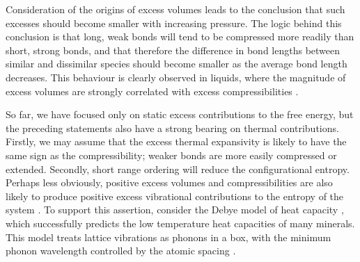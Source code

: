Consideration of the origins of excess volumes leads to the conclusion that such excesses should become smaller with increasing pressure. The logic behind this conclusion is that long, weak bonds will tend to be compressed more readily than short, strong bonds, and that therefore the difference in bond lengths between similar and dissimilar species should become smaller as the average bond length decreases. This behaviour is clearly observed in liquids, where the magnitude of excess volumes are strongly correlated with excess compressibilities \citep{FM1965}.

So far, we have focused only on static excess contributions to the free energy, but the preceding statements also have a strong bearing on thermal contributions. Firstly, we may assume that the excess thermal expansivity is likely to have the same sign as the compressibility; weaker bonds are more easily compressed or extended. Secondly, short range ordering will reduce the configurational entropy. Perhaps less obviously, positive excess volumes and compressibilities are also likely to produce positive excess vibrational contributions to the entropy of the system \citep[e.g.][]{WC2002}. To support this assertion, consider the Debye model of heat capacity \citep{Debye1912}, which successfully predicts the low temperature heat capacities of many minerals. This model treats lattice vibrations as phonons in a box, with the minimum phonon wavelength controlled by the atomic spacing \citep{AM1976, Grimvall1999}. %
